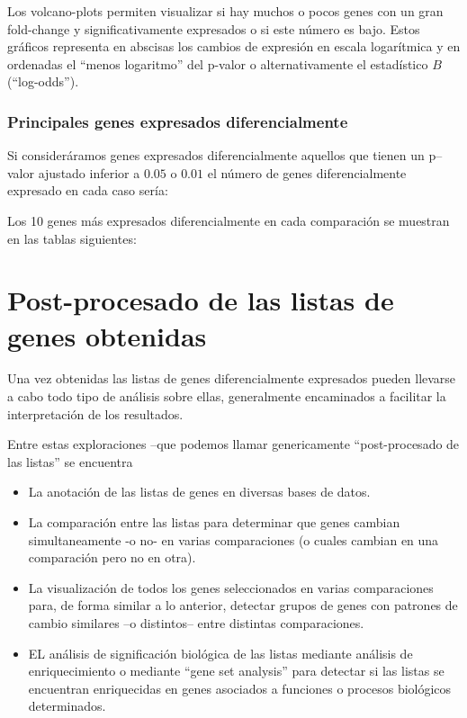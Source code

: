 \documentclass[a4paper]{article}\usepackage[]{graphicx}\usepackage[]{color}
\begin{document}
Los volcano-plots permiten visualizar si hay muchos o pocos genes con un gran fold-change y significativamente expresados o si este número es bajo. Estos gráficos representa en abscisas los cambios de expresión en escala logarítmica
y en ordenadas el ``menos logaritmo'' del p-valor o alternativamente el estadístico $B$ (``log-odds'').




\subsubsection{Principales genes expresados diferencialmente}

Si consideráramos genes expresados diferencialmente aquellos que tienen un p--valor ajustado inferior a $0.05$ o $0.01$ el número de genes diferencialmente expresado en cada caso sería:




Los 10 genes más expresados diferencialmente en cada comparaci\'on se muestran en las tablas siguientes:








\section{Post-procesado de las listas de genes obtenidas}

Una vez obtenidas las listas de genes diferencialmente expresados pueden llevarse a cabo todo tipo de análisis sobre ellas, generalmente encaminados a facilitar la interpretación de los resultados.

Entre estas exploraciones --que podemos llamar genericamente ``post-procesado de las listas'' se encuentra

\begin{itemize}
\item La anotación de las listas de genes en diversas bases de datos.

\item La comparaci\'on entre las listas para determinar que genes cambian simultaneamente -o no- en varias comparaciones (o cuales cambian en una comparaci\'on pero no en otra).
\item La visualización de todos los genes seleccionados en varias comparaciones para, de forma similar a lo anterior, detectar grupos de genes con patrones de cambio similares --o distintos-- entre distintas comparaciones.
\item EL análisis de significación biológica de las listas mediante análisis de enriquecimiento o mediante ``gene set analysis'' para detectar si las listas se encuentran enriquecidas en genes asociados a funciones o procesos biológicos determinados.
\end{itemize}
\end{document}
